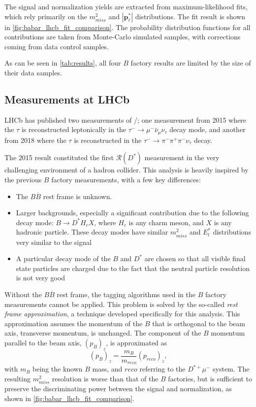 \documentclass[12pt,letterpaper]{article}
\renewcommand{\vec}[1]{\mathbf{#1}}                   %
\def\RDst/{\ensuremath{\mathcal{R}(D^{*})}}
\begin{document}
The signal and normalization yields are extracted from maximum-likelihood fits, which rely primarily on  
the $m^2_{miss}$ and $|\vec{p}^*_\ell|$ distributions.
The fit result is shown in \autoref{fig:babar_lhcb_fit_comparison}.
The probability distribution functions for all contributions are taken from Monte-Carlo simulated samples, with corrections coming from data control samples.

As can be seen in \autoref{tab:results}, all four $B$ factory results are limited by the size of their data samples. 

\subsection{Measurements at LHCb} \label{sec:meas_lhcb}
LHCb has published two measurements of \RDST/; one measurement from 2015 where the $\tau$ is reconstructed leptonically in the $\tau^- \rightarrow \mu^- \bar{\nu}_\mu \nu_\tau$ decay mode,
and another from 2018 where the $\tau$ is reconstructed in the $\tau^- \rightarrow \pi^- \pi^+ \pi^- \nu_\tau$ decay.

The 2015 result constituted the first \RDst/ measurement in the very challenging environment of a hadron collider.
This analysis is heavily inspired by the previous $B$ factory measurements, with
a few key differences:

\begin{itemize}
    \item The $B \overline{B}$ rest frame is unknown.
    \item Larger backgrounds, especially a significant contribution due to the following decay mode:
          $B \rightarrow D^* H_c X$, where $H_c$ is any charm meson, and $X$ is any hadronic particle. 
          These decay modes have similar $m^2_{miss}$ and
          $E^{*}_l$ distributions very similar to the signal
    \item A particular
          decay mode of the $B$ and $D^{*}$ are chosen so that all visible final state particles are charged due to the fact that the neutral particle resolution is not very good
\end{itemize}

Without the $B \overline{B}$ rest frame, the tagging algorithms used in the $B$
factory measurements cannot be applied.
This problem is solved by the so-called \emph{rest frame approximation}, a technique developed
specifically for this analysis.
This approximation assumes the momentum of the $B$ that is orthogonal to the beam axis, transverse momentum, is unchanged.
The component of the $B$ momentum parallel to the beam axis, $(p_{B})_z$, is approximated as
\begin{equation}
    (p_{B})_z = \frac{m_B}{m_{reco}} (p_{reco})_z,
\end{equation}
with $m_B$ being the known $B$ mass, and $reco$ referring to the $D^{*+} \mu^-$ system.
The resulting $m^2_{miss}$ resolution is worse than that of the $B$ factories, but is sufficient to preserve the discriminating power between the signal and normalization, as shown in \autoref{fig:babar_lhcb_fit_comparison}.
\end{document}
